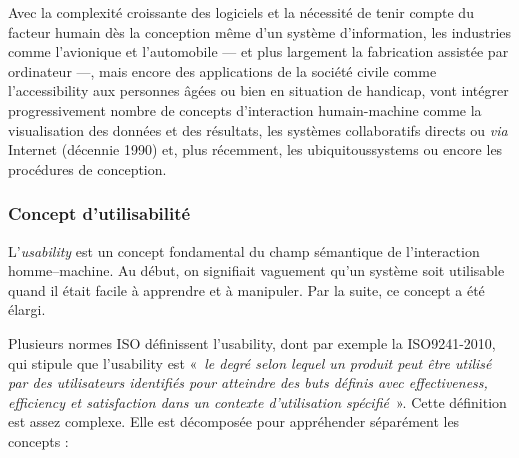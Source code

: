 Avec la complexité croissante des logiciels et la nécessité de tenir compte du facteur humain dès la conception même d'un système d'information, les industries comme l'avionique et l'automobile --- et plus largement la fabrication assistée par ordinateur ---, mais encore des applications de la société civile comme l'\gls{accessibility} aux personnes âgées ou bien en situation de handicap, vont intégrer progressivement nombre de concepts d'interaction humain-machine comme la visualisation des données et des résultats, les systèmes collaboratifs directs ou \textit{via} Internet (décennie 1990) et, plus récemment, les \glspl{ubiquitoussystem} ou encore les procédures de conception.

\subsubsection[Concept d'utilisabilité]{Concept d'utilisabilité}
\label{subsub:I.3.1.2}

L'\emph{\gls{usability}} est un concept fondamental du champ sémantique de l'interaction homme--machine. Au début, on signifiait vaguement qu'un système soit utilisable quand il était facile à apprendre et à manipuler. Par la suite, ce concept a été élargi. 

Plusieurs normes ISO définissent l'\gls{usability}, dont par exemple la \gls{ISO9241-2010}, qui stipule que l'\gls{usability} est «~\textit{le degré selon lequel un produit peut être utilisé par des utilisateurs identifiés pour atteindre des buts définis avec \gls{effectiveness}, \gls{efficiency} et \gls{satisfaction} dans un contexte d'utilisation spécifié}~». Cette définition est assez complexe. Elle est décomposée pour appréhender séparément les concepts :

